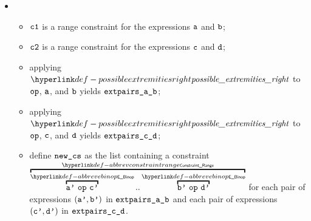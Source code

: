 \begin{itemize}
  \item {}
  \begin{itemize}
    \item $\vcone$ is a range constraint for the expressions $\va$ and $\vb$;
    \item $\vctwo$ is a range constraint for the expressions $\vc$ and $\vd$;
    \item applying $\possibleextremitiesright$ to $\op$, $\va$, and $\vb$ yields $\extpairsab$;
    \item applying $\possibleextremitiesright$ to $\op$, $\vc$, and $\vd$ yields $\extpairscd$;
    \item define $\newcs$ as the list containing a constraint $\AbbrevConstraintRange{\AbbrevEBinop{\op}{\vap}{\vcp}}{\AbbrevEBinop{\op}{\vbp}{\vdp}}$
          for each pair of expressions
          $(\vap, \vbp)$ in $\extpairsab$
          and each pair of expressions
          $(\vcp, \vdp)$ in $\extpairscd$.
  \end{itemize}
\end{itemize}

\FormallyParagraph
\begin{mathpar}
\end{mathpar}

\begin{mathpar}
\end{mathpar}

\begin{mathpar}
\end{mathpar}

